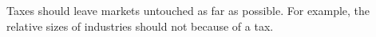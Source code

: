 Taxes should leave markets untouched as far as possible.
For example, the relative sizes of industries should not because of a tax.